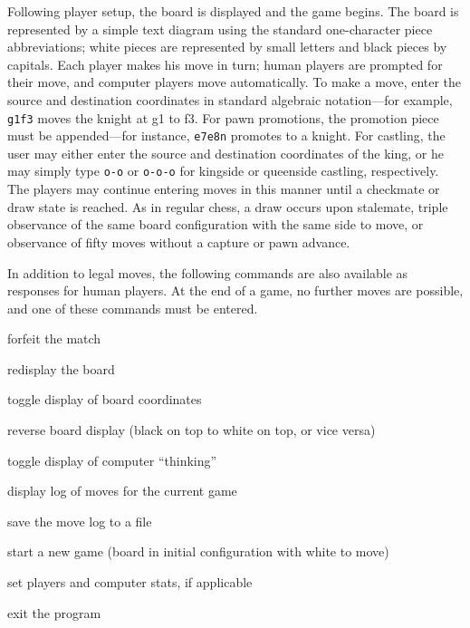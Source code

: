\documentclass[a4paper]{article}
\begin{document}
Following player setup, the board is displayed and the game begins.
The board is represented by a simple text diagram using the standard
one-character piece abbreviations; white pieces are represented by
small letters and black pieces by capitals.  Each player makes his
move in turn; human players are prompted for their move, and computer
players move automatically. To make a move, enter the source and
destination coordinates in standard algebraic notation---for example,
\texttt{g1f3} moves the knight at g1 to f3.  For pawn promotions, the
promotion piece must be appended---for instance, \texttt{e7e8n}
promotes to a knight. For castling, the user may either enter the
source and destination coordinates of the king, or he may simply type
\texttt{o-o} or \texttt{o-o-o} for kingside or queenside castling,
respectively. The players may continue entering moves in this manner
until a checkmate or draw state is reached. As in regular chess, a
draw occurs upon stalemate, triple observance of the same board
configuration with the same side to move, or observance of fifty moves
without a capture or pawn advance.

In addition to legal moves, the following commands are also available
as responses for human players. At the end of a game, no further moves
are possible, and one of these commands must be entered.

\renewenvironment{description}{%
  \begin{basedescript}{%
      \desclabelwidth{0.66in}\desclabelstyle{\nextlinelabel}%
  }%
}{%
  \end{basedescript}%
}

\begin{description}
\item[\texttt{resign}] forfeit the match
\item[\texttt{bd}] redisplay the board
\item[\texttt{coords}] toggle display of board coordinates
\item[\texttt{reverse}] reverse board display (black on top to white on top, or vice versa)
\item[\texttt{think}] toggle display of computer ``thinking''
\item[\texttt{log}] display log of moves for the current game
\item[\texttt{save}] save the move log to a file
\item[\texttt{new}] start a new game (board in initial configuration with white to move)
\item[\texttt{who}] set players and computer stats, if applicable
\item[\texttt{quit}] exit the program
\end{description}
\end{document}
